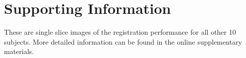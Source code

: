 \section*{Supporting Information}
\label{SI}
These are single slice images of the registration performance for all other 10 subjects. More detailed information can be found in the online supplementary materials.
